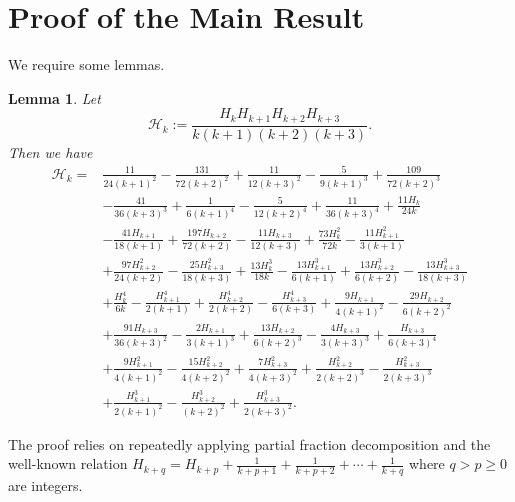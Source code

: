 \documentclass[10pt]{amsart}
\newtheorem{lemma}{Lemma}
\theoremstyle{definition}
\begin{document}
\section{Proof of the Main Result}
We require some lemmas.
\begin{lemma} \label{ExpandConsecutiveProd}
    Let
    $$\mathscr{H}_k := \frac{H_k H_{k+1} H_{k+2} H_{k+3}}{k(k+1)(k+2)(k+3)}.$$
    Then we have
    \begin{align*}
        \mathscr{H}_k
        =& \frac{11}{24 (k+1)^2} - \frac{131}{72 (k+2)^2} + \frac{11}{12(k+3)^2}- \frac{5}{9 (k+1)^3} + \frac{109}{72 (k+2)^3} \\
        &- \frac{41}{36 (k+3)^3} + \frac{1}{6 (k+1)^4} - \frac{5}{12(k+2)^4} + \frac{11}{36(k+3)^4} + \frac{11 H_k}{24 k} \\
        &-\frac{41 H_{k+1}}{18 (k+1)} + \frac{197 H_{k+2}}{72 (k+2)} - \frac{11 H_{k+3}}{12 (k+3)} + \frac{73 H_k^2}{72 k} - \frac{11 H_{k+1}^2}{3(k+1)} \\
        &+\frac{97 H_{k+2}^2}{24 (k+2)} - \frac{25 H_{k+3}^2}{18 (k+3)} + \frac{13 H_k^3}{18 k} - \frac{13 H_{k+1}^3}{6 (k+1)} + \frac{13 H_{k+2}^3}{6 (k+2)} -\frac{13 H_{k+3}^3}{18 (k+3)} \\
        &+ \frac{H_k^4}{6 k} - \frac{H_{k+1}^4}{2 (k+1)} + \frac{H_{k+2}^4}{2 (k+2)} - \frac{H_{k+3}^4}{6 (k+3)} +\frac{9 H_{k+1}}{4 (k+1)^2} - \frac{29 H_{k+2}}{6 (k+2)^2} \\
        &+ \frac{91 H_{k+3}}{36 (k+3)^2} - \frac{2 H_{k+1}}{3 (k+1)^3} + \frac{13 H_{k+2}}{6 (k+2)^3} - \frac{4 H_{k+3}}{3 (k+3)^3} + \frac{H_{k+3}}{6 (k+3)^4} \\
        &+ \frac{9 H_{k+1}^2}{4 (k+1)^2} - \frac{15 H_{k+2}^2}{4 (k+2)^2} + \frac{7 H_{k+3}^2}{4 (k+3)^2} +\frac{H_{k+2}^2}{2(k+2)^3} - \frac{H_{k+3}^2}{2(k+3)^3} \\
        &+ \frac{H_{k+1}^3}{2 (k+1)^2} - \frac{H_{k+2}^3}{(k+2)^2} + \frac{H_{k+3}^3}{2 (k+3)^2}.
    \end{align*}
\end{lemma}
The proof relies on repeatedly applying partial fraction decomposition and the well-known relation $H_{k+q} = H_{k+p} + \frac{1}{k + p+1} + \frac{1}{k + p + 2} + \cdots + \frac{1}{k + q}$ where $q > p \geq 0$ are integers.
\end{document}
